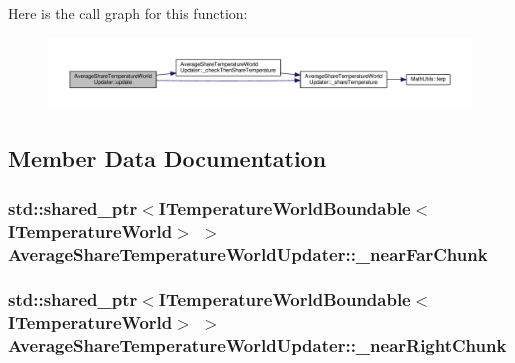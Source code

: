 Here is the call graph for this function\-:
\nopagebreak
\begin{figure}[H]
\begin{center}
\leavevmode
\includegraphics[width=350pt]{class_average_share_temperature_world_updater_a29be9be2073572f3ef2dc5315c506245_cgraph}
\end{center}
\end{figure}




\subsection{Member Data Documentation}
\hypertarget{class_average_share_temperature_world_updater_a0164e9a5b9b614a3fb6fc360d4c0864a}{
\subsubsection[{\-\_\-near\-Far\-Chunk}]{\setlength{\rightskip}{0pt plus 5cm}std\-::shared\-\_\-ptr$<${\bf I\-Temperature\-World\-Boundable}$<${\bf I\-Temperature\-World}$>$ $>$ Average\-Share\-Temperature\-World\-Updater\-::\-\_\-near\-Far\-Chunk\hspace{0.3cm}{\ttfamily [protected]}}}\label{class_average_share_temperature_world_updater_a0164e9a5b9b614a3fb6fc360d4c0864a}
\hypertarget{class_average_share_temperature_world_updater_a1e5e2936bb7b6613a27129a2a199247d}{
\subsubsection[{\-\_\-near\-Right\-Chunk}]{\setlength{\rightskip}{0pt plus 5cm}std\-::shared\-\_\-ptr$<${\bf I\-Temperature\-World\-Boundable}$<${\bf I\-Temperature\-World}$>$ $>$ Average\-Share\-Temperature\-World\-Updater\-::\-\_\-near\-Right\-Chunk\hspace{0.3cm}{\ttfamily [protected]}}}\label{class_average_share_temperature_world_updater_a1e5e2936bb7b6613a27129a2a199247d}
